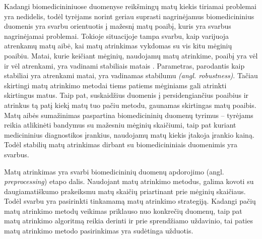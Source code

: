


Kadangi biomedicininiuose duomenyse reikšmingų matų kiekis tiriamai problemai yra nedidelis, todėl tyrėjams norint geriau suprasti nagrinėjamus biomedicininius duomenis yra svarbu orientuotis į mažesnį matų poaibį, kuris yra svarbus nagrinėjamai problemai. Tokioje situacijoje tampa svarbu, kaip varijuoja atrenkamų matų aibė, kai matų atrinkimas vykdomas su vis kitu mėginių poaibiu. Matai, kurie keičiant mėginių, naudojamų matų atrinkime, poaibį yra vėl ir vėl atrenkami, yra vadinami stabiliais matais \cite{devijver1982pattern}. Parametras, parodantis kaip stabiliai yra atrenkami matai, yra vadinamas stabilumu \textit{(angl. robustness)}. Tačiau skirtingi matų atrinkimo metodai tiems patiems mėginiams gali atrinkti skirtingus matus. Taip pat, suskaidžius duomenis į persidengiančius poaibius ir atrinkus tą patį kiekį matų tuo pačiu metodu, gaunamas skirtingas matų poaibis. Matų aibės sumažinimas paspartina biomedicininių duomenų tyrimus -- tyrėjams reikia atlikinėti bandymus su mažesniu mėginių skaičiumi, taip 
pat kuriant medicininius diagnostikos įrankius, naudojamų matų kiekis įtakoja įrankio kainą. Todėl stabilių matų atrinkimas dirbant su biomedicininiais duomenimis yra svarbus.

Matų atrinkimas yra svarbi biomedicininių duomenų apdorojimo (angl. \textit{preprocessing}) etapo dalis. Naudojant matų atrinkimo metodus, galima kovoti su daugiamatiškumo prakeiksmu matų skaičių priartinant prie mėginių skaičiaus. Todėl svarbu yra pasirinkti tinkamamą matų atrinkimo strategiją. Kadangi pačių matų atrinkimo metodų veikimas priklauso nuo konkrečių duomenų, taip pat matų atrinkimo algoritmą reikia derinti ir prie sprendžiamo uždavinio, tai paties matų atrinkimo metodo pasirinkimas yra sudėtinga užduotis. 

